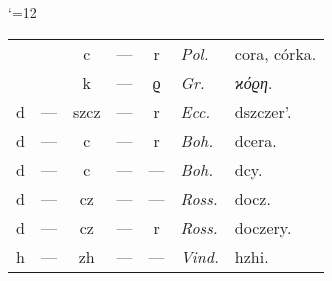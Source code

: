 {\catcode`\@=12

\begin{center}
\begin{tabular}{ccccc@{\hskip 1.5em}l@{\hskip 0.5em}l}
 & &c   &—&r& \textit{Pol.} &cora, córka.\\
 & &k   &—&ϱ& \textit{Gr.}  &\textit{ϰόϱη}.\\
d&—&szcz&—&r& \textit{Ecc.} &dszczer'.\\
d&—&c   &—&r& \textit{Boh.} &dcera.\\
d&—&c   &—&—& \textit{Boh.} &dcy.\\
d&—&cz  &—&—& \textit{Ross.}&docz.\\
d&—&cz  &—&r& \textit{Ross.}&doczery.\\
h&—&zh  &—&—& \textit{Vind.}&hzhi.\\
\end{tabular}
\end{center}

}

